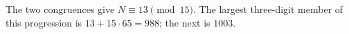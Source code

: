 The two congruences give $N\equiv13\pmod{15}$. The largest three-digit member of this progression is $13+15\cdot65=\boxed{988}$; the next is $1003$.
